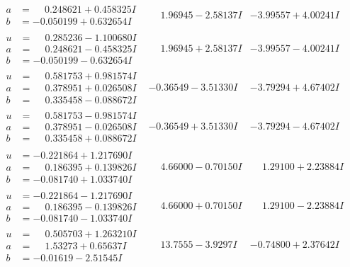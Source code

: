 \documentclass[1p]{elsarticle_modified}
\theoremstyle{definition}
\begin{document}
$$\begin{array}{c|c|c}
\begin{aligned}
a &= \phantom{-}0.248621 + 0.458325 I \\
b &= -0.050199 + 0.632654 I\end{aligned}
 & \phantom{-}1.96945 - 2.58137 I & -3.99557 + 4.00241 I \\ \hline\begin{aligned}
u &= \phantom{-}0.285236 - 1.100680 I \\
a &= \phantom{-}0.248621 - 0.458325 I \\
b &= -0.050199 - 0.632654 I\end{aligned}
 & \phantom{-}1.96945 + 2.58137 I & -3.99557 - 4.00241 I \\ \hline\begin{aligned}
u &= \phantom{-}0.581753 + 0.981574 I \\
a &= \phantom{-}0.378951 + 0.026508 I \\
b &= \phantom{-}0.335458 - 0.088672 I\end{aligned}
 & -0.36549 - 3.51330 I & -3.79294 + 4.67402 I \\ \hline\begin{aligned}
u &= \phantom{-}0.581753 - 0.981574 I \\
a &= \phantom{-}0.378951 - 0.026508 I \\
b &= \phantom{-}0.335458 + 0.088672 I\end{aligned}
 & -0.36549 + 3.51330 I & -3.79294 - 4.67402 I \\ \hline\begin{aligned}
u &= -0.221864 + 1.217690 I \\
a &= \phantom{-}0.186395 + 0.139826 I \\
b &= -0.081740 + 1.033740 I\end{aligned}
 & \phantom{-}4.66000 - 0.70150 I & \phantom{-}1.29100 + 2.23884 I \\ \hline\begin{aligned}
u &= -0.221864 - 1.217690 I \\
a &= \phantom{-}0.186395 - 0.139826 I \\
b &= -0.081740 - 1.033740 I\end{aligned}
 & \phantom{-}4.66000 + 0.70150 I & \phantom{-}1.29100 - 2.23884 I \\ \hline\begin{aligned}
u &= \phantom{-}0.505703 + 1.263210 I \\
a &= \phantom{-}1.53273 + 0.65637 I \\
b &= -0.01619 - 2.51545 I\end{aligned}
 & \phantom{-}13.7555 - 3.9297 I & -0.74800 + 2.37642 I \\ \hline\begin{aligned}

\end{aligned}
\end{array}$$
\end{document}
